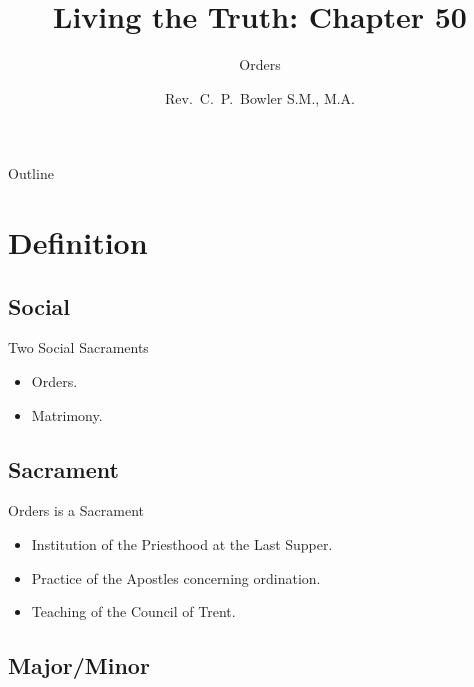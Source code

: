 \documentclass{beamer}
\title[Living the Truth 50] %
{Living the Truth: Chapter 50}
\subtitle
{Orders} %
\author{Rev.~C.~P.~Bowler S.M., M.A.}
\begin{document}
\begin{frame}
  \titlepage
\end{frame}

\begin{frame}{Outline}
  \tableofcontents
\end{frame}




\section{Definition}

\subsection{Social}

\begin{frame}{Two Social Sacraments}
\begin{itemize}
\item Orders.
\item Matrimony.
\end{itemize}
\end{frame}

\subsection{Sacrament}

\begin{frame}{Orders is a Sacrament}
\begin{itemize}
 \item Institution of the Priesthood at the Last Supper.
 \item Practice of the Apostles concerning ordination.
 \item Teaching of the Council of Trent.
\end{itemize}
\end{frame}

\subsection{Major/Minor}
\end{document}
